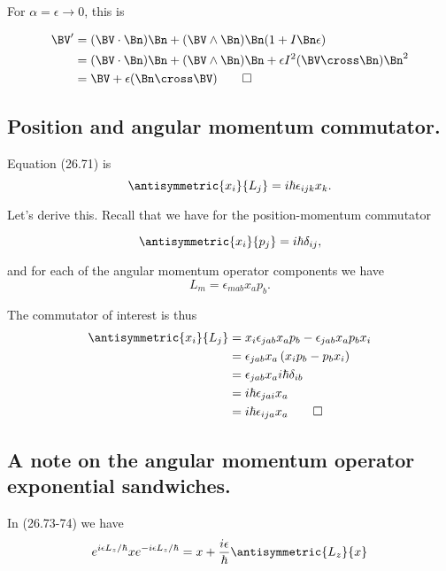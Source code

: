 For $\alpha = \epsilon \rightarrow 0$, this is

\begin{align*}
\BV' 
&=
(\BV \cdot \Bn)\Bn
+(\BV \wedge \Bn)\Bn
( 1 + I \Bn \epsilon) \\
&=
(\BV \cdot \Bn)\Bn 
+(\BV \wedge \Bn)\Bn
+\epsilon I^2(\BV \cross \Bn)\Bn^2 \\
&=
\BV
+ \epsilon (\Bn \cross \BV) \qquad\square
\end{align*}

\subsection{Position and angular momentum commutator.}

Equation (26.71) is
\begin{equation}\label{eqn:desaiCh26:70}
\antisymmetric{x_i}{L_j} = i \hbar \epsilon_{ijk} x_k.
\end{equation}

Let's derive this.  Recall that we have for the position-momentum commutator

\begin{equation}\label{eqn:desaiCh26:80}
\antisymmetric{x_i}{p_j} = i \hbar \delta_{ij},
\end{equation}

and for each of the angular momentum operator components we have
\begin{equation}\label{eqn:desaiCh26:90}
L_m = \epsilon_{mab} x_a p_b.
\end{equation}

The commutator of interest is thus
\begin{align*}
\antisymmetric{x_i}{L_j} 
&= 
x_i \epsilon_{jab} x_a p_b 
-
\epsilon_{jab} x_a p_b x_i \\
&= 
\epsilon_{jab} 
x_a
\left(
x_i 
p_b 
-
p_b x_i \right) \\
&=
\epsilon_{jab} 
x_a
i \hbar \delta_{ib} \\
&=
i \hbar 
\epsilon_{jai} 
x_a \\
&=
i \hbar 
\epsilon_{ija} 
x_a \qquad\square
\end{align*}

\subsection{A note on the angular momentum operator exponential sandwiches.}

In (26.73-74) we have
\begin{equation}\label{eqn:desaiCh26:100}
e^{i \epsilon L_z/\hbar} x e^{-i \epsilon L_z/\hbar} 
= x + \frac{i \epsilon}{\hbar} \antisymmetric{L_z}{x}
\end{equation}

